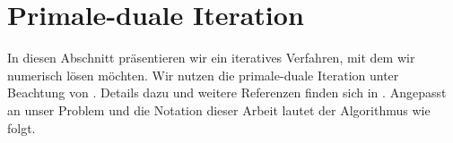 \section{Primale-duale Iteration}

In diesen Abschnitt präsentieren wir ein iteratives Verfahren, mit dem wir
 numerisch lösen möchten. 
Wir nutzen  die primale-duale Iteration \cite[S. 314, Algorithm
10.1]{Bar15} unter Beachtung von \cite[S. 314, Remark 10.11]{Bar15}. 
Details dazu und weitere Referenzen finden sich in
\cites{Bar12}[S. 118-121]{Bar15}.
Angepasst an unser Problem und die Notation dieser Arbeit lautet der
Algorithmus wie folgt.


